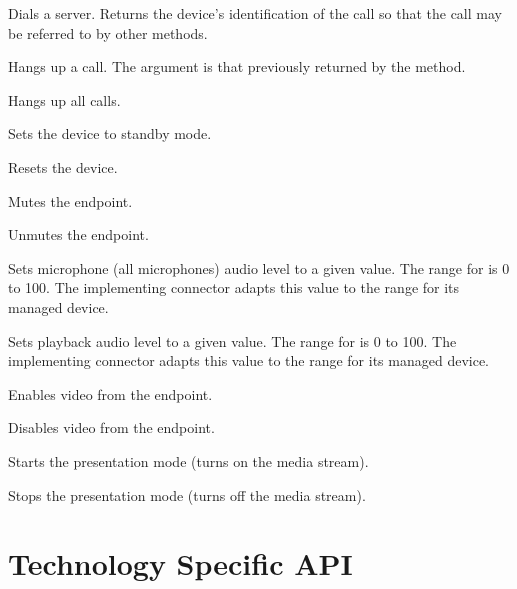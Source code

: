 \begin{Api}

Dials a server. Returns the device's identification of the call so that the call may be referred to by other methods.

Hangs up a call. The  argument is that previously returned by the  method.

Hangs up all calls.

Sets the device to standby mode.

Resets the device.

Mutes the endpoint.

Unmutes the endpoint.

Sets microphone (all microphones) audio level to a given value. The range for  is 0 to 100. The implementing connector adapts this value to the range for its managed device.

Sets playback audio level to a given value. The range for  is 0 to 100. The implementing connector adapts this value to the range for its managed device.

Enables video from the endpoint.

Disables video from the endpoint.

Starts the presentation mode (turns on the media stream).

Stops the presentation mode (turns off the media stream).

\end{Api}


\section{Technology Specific API}


